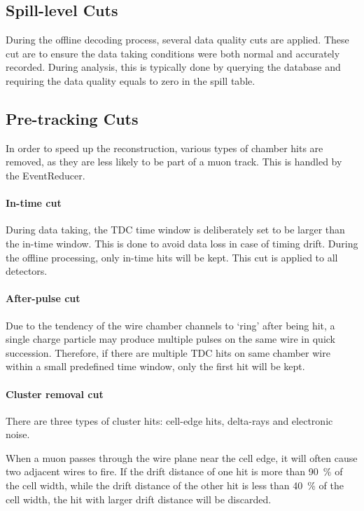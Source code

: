 \documentclass[../main.tex]{subfiles}
\begin{document}
\subsection{Spill-level Cuts}
During the offline decoding process, several data quality cuts are applied.
These cut are to ensure the data taking conditions were both normal and accurately recorded.
During analysis, this is typically done by querying the database
and requiring the data quality equals to zero in the spill table.

\subsection{Pre-tracking Cuts}
In order to speed up the reconstruction, various types of chamber hits are removed, as
they are less likely to be part of a muon track. This is handled by the EventReducer.

\paragraph{In-time cut}
During data taking, the TDC time window is deliberately set to be larger than the in-time
window. This is done to avoid data loss in case of timing drift\cite{daniel-4924}.
During the offline processing, only in-time hits will be kept. This cut is applied to
all detectors.

\paragraph{After-pulse cut}
Due to the tendency of the wire chamber channels to `ring' after being hit,
a single charge particle may produce multiple pulses on the same
wire in quick succession. Therefore, if there are multiple TDC hits on same chamber wire
within a small predefined time window, only the first hit will be kept.

\paragraph{Cluster removal cut}
There are three types of cluster hits: cell-edge hits, delta-rays and electronic noise.

When a muon passes through the wire plane near the cell edge, it will often cause two adjacent
wires to fire. If the drift distance of one hit is more than \SI{90}{\percent} of the cell width,
while the drift distance of the other hit is less than \SI{40}{\percent} of the cell width, the hit
with larger drift distance will be discarded.
\end{document}
